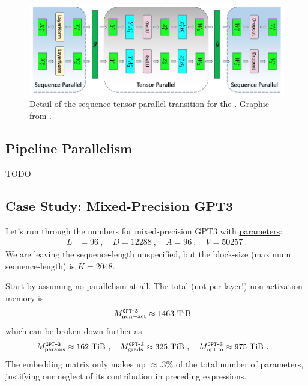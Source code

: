 \documentclass[11pt]{article}
\begin{document}
\begin{figure}[ht]
	\centering
	\includegraphics[scale=.25]{figures/mlp-tensor-sequence-parallel.jpg}
	\caption{Detail of the sequence-tensor parallel transition for the  . Graphic from
		\cite{shoeybi2020megatronlm}. }
	\label{fig_tensor_seq_parallel_detail}
\end{figure}


\subsection{Pipeline Parallelism \label{subsec_pipe_parallelism}}

TODO






\subsection{Case Study: Mixed-Precision GPT3 \label{subsec_gpt_mem_study} }

Let's run through the numbers for mixed-precision GPT3 with
\href{https://bmk.sh/2020/05/29/GPT-3-A-Brief-Summary/}{parameters}:
\begin{align}
	L & = 96 \ , \quad
	D = 12288 \ ,\quad
	A = 96\ , \quad V = 50257\ .
	\label{eq_gpt_num}
\end{align}
We are leaving the sequence-length unspecified, but the block-size (maximum sequence-length) is $
	K=2048 $.


Start by assuming no parallelism at all. The total (not per-layer!) non-activation memory is
\begin{align}
	M _{ {\rm non-act}  } ^ \texttt{GPT-3} & \approx 1463\ {\rm TiB}
\end{align}
which can be broken down further as
\begin{align}
	M _{ {\rm params}  } ^ \texttt{GPT-3} & \approx 162\ {\rm TiB} \ , \quad
	M _{ {\rm grads}  } ^ \texttt{GPT-3}  \approx 325\ {\rm TiB}\ , \quad
	M _{ {\rm optim}  } ^ \texttt{GPT-3}  \approx 975\ {\rm TiB}\ .
\end{align}
The embedding matrix only makes up $ \approx .3\% $ of the total number of parameters, justifying our
neglect of its contribution in preceding expressions.
\end{document}
